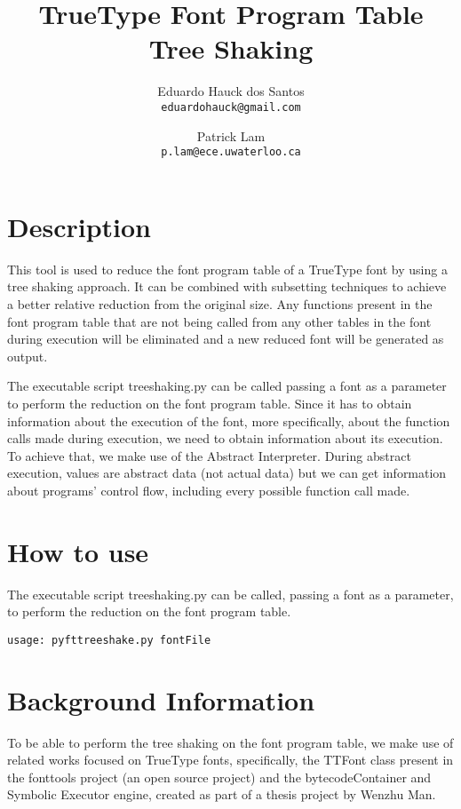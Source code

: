\documentclass[12pt]{article}
\title{TrueType Font Program Table Tree Shaking}
\author{
  Eduardo Hauck dos Santos\\
  \texttt{eduardohauck@gmail.com}
  \and
  Patrick Lam\\
  \texttt{p.lam@ece.uwaterloo.ca}
}
\date{}
\begin{document}
\maketitle

\section{Description}

This tool is used to reduce the font program table of a
TrueType font by using a tree shaking approach. It can be combined with
subsetting techniques to achieve a better relative reduction from the
original size. Any functions present in the font program table that are
not being called from any other tables in the font during execution will
be eliminated and a new reduced font will be generated as output.

The executable script treeshaking.py can be called passing a
font as a parameter to perform the reduction on the font program table.
Since it has to obtain information about the execution of the font, more
specifically, about the function calls made during execution, we need
to obtain information about its execution. To achieve that, we make use
of the Abstract Interpreter. During abstract execution, values are
abstract data (not actual data) but we can get information about
programs' control flow, including every possible function call made.

\section{How to use}

The executable script treeshaking.py can be called, passing a
font as a parameter, to perform the reduction on the font program table.

\begin{lstlisting}
usage: pyfttreeshake.py fontFile
\end{lstlisting}

\section{Background Information}

To be able to perform the tree shaking on the font program table,
we make use of related works focused on TrueType fonts, specifically,
the TTFont class present in the fonttools project \cite{fonttools} 
(an open source project) and the bytecodeContainer and Symbolic Executor
engine, created as part of a thesis project\cite{bytecode} by Wenzhu Man.
\end{document}
